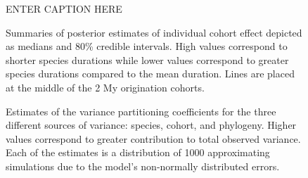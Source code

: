 \documentclass[12pt]{article}
\begin{document}
\begin{figure}[ht]
  \caption{ENTER CAPTION HERE}
  \label{fig:eff_other}
\end{figure}

\begin{figure}[ht]
  \caption{Summaries of posterior estimates of individual cohort effect depicted as medians and 80\% credible intervals. High values correspond to shorter species durations while lower values correspond to greater species durations compared to the mean duration. Lines are placed at the middle of the 2 My origination cohorts.}
  \label{fig:eff_cohort}
\end{figure}

\begin{figure}[ht]
  \caption{Estimates of the variance partitioning coefficients for the three different sources of variance: species, cohort, and phylogeny. Higher values correspond to greater contribution to total observed variance. Each of the estimates is a distribution of 1000 approximating simulations due to the model's non-normally distributed errors.}
  \label{fig:vpc}
\end{figure}
\end{document}
